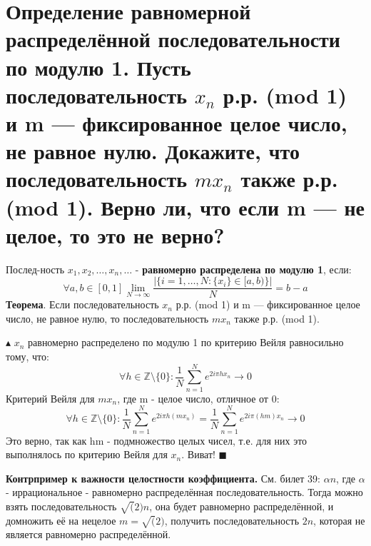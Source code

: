 \setcounter{section}{40}
\section{Определение равномерной распределённой последовательности по модулю 1. Пусть последовательность $x_n$ р.р. (mod 1) и m — фиксированное целое число, не равное нулю. Докажите, что последовательность $mx_n$ также р.р. (mod 1). Верно ли, что если m — не целое, то это не верно?}
Послед-ность $x_1, x_2, \dots, x_n, \dots$ - \textbf{равномерно распределена по модулю 1}, если:
\[ \forall a, b \in [0, 1] \lim_{N \to \infty} \frac{|\{i = 1, \dots, N: \{x_i\} \in [a, b)\}|}{N} = b - a \]
\textbf{Теорема}. Если последовательность $x_n$ р.р. (mod 1) и m — фиксированное целое число, не равное нулю, то последовательность $mx_n$ также р.р. (mod 1). \par
$\blacktriangle$
$x_n$ равномерно распределено по модулю 1 по критерию Вейля равносильно тому, что:
\[
\forall h \in \mathbb{Z} \setminus \{ 0 \}: \frac{1}{N}\sum_{n=1}^N e^{2i\pi h x_n} \to 0
\]
Критерий Вейля для $mx_n$, где m - целое число, отличное от 0:
\[
\forall h \in \mathbb{Z} \setminus \{ 0 \}: \frac{1}{N}\sum_{n=1}^N e^{2i\pi h(m x_n)} =  \frac{1}{N}\sum_{n=1}^N e^{2i\pi (hm) x_n}\to 0
\]
Это верно, так как hm - подмножество целых чисел, т.е. для них это выполнялось по критерию Вейля для $x_n$. Виват!
$\blacksquare$ \par
\textbf{Контрпример к важности целостности коэффициента.} См. билет 39: $\alpha n$, где $\alpha$ - иррациональное - равномерно распределённая последовательность. Тогда можно взять последовательность $\sqrt(2)n$, она будет равномерно распределённой, и домножить её на нецелое $m=\sqrt(2)$, получить последовательность $2n$, которая не является равномерно распределённой.